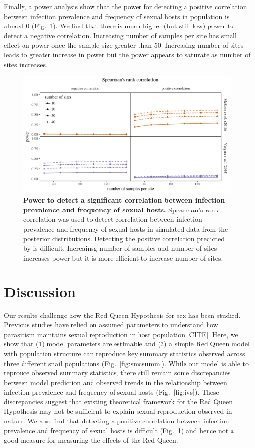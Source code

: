\documentclass{article}\usepackage[]{graphicx}\usepackage[]{color}
\newcommand{\fref}[1]{Fig.~\ref{fig:#1}}
\begin{document}
Finally, a power analysis show that the power for detecting a positive correlation between infection prevalence and frequency of sexual hosts in \cite{vergara2014infection} population is almost 0 (\fref{power}).
We find that there is much higher (but still low) power to detect a negative correlation.
Increasing number of samples per site has small effect on power once the sample size greater than 50.
Increasing number of sites leads to greater increase in power but the power appears to saturate as number of sites increases.

\begin{figure}[!htp]
\includegraphics[width=\textwidth]{../fig/power.pdf}
\caption{{\bf Power to detect a significant correlation between infection prevalence and frequency of sexual hosts.}
Spearman's rank correlation was used to detect correlation between infection prevalence and frequency of sexual hosts in simulated data from the posterior distributions. Detecting the positive correlation predicted by \cite{lively2001trematode} is difficult. Increainsg number of samples and number of sites increases power but it is more efficient to increase number of sites.}
\label{fig:power}
\end{figure}

\section{Discussion}

Our results challenge how the Red Queen Hypothesis for sex has been studied.
Previous studies have relied on assumed parameters to understand how parasitism maintains sexual reproduction in host population [CITE].
Here, we show that (1) model parameters are estimable and (2) a simple Red Queen model with population structure can reproduce key summary statistics observed across three different snail populations (\fref{smcsumm}).
While our model is able to reprouce observed summary statistics, there still remain some discrepancies between model prediction and observed trends in the relationship between infection prevalence and frequency of sexual hosts (\fref{ivs}).
These discrepancies suggest that existing theoretical framework for the Red Queen Hypothesis may not be sufficient to explain sexual reproduction observed in nature.
We also find that detecting a positive correlation between infection prevalence and frequency of sexual hosts is difficult (\fref{power}) and hence not a good measure for measuring the effects of the Red Queen.
\end{document}
